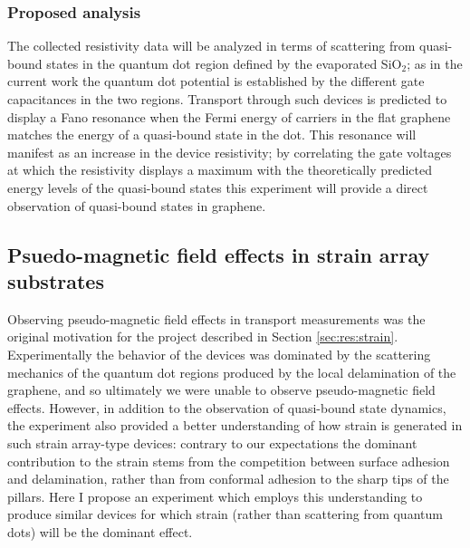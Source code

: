\documentclass[edeposit,fullpage,draftthesis]{uiucthesis2009}
\begin{document}
        \subsubsection*{Proposed analysis}
        
            The collected resistivity data will be analyzed in terms of scattering from quasi-bound
            states in the quantum dot region defined by the evaporated SiO$_2$; as in the current work
            the quantum dot potential is established by the different gate capacitances in the two regions.
            Transport through such devices is predicted to display a Fano
            resonance when the Fermi energy of carriers in the flat graphene matches the energy of a quasi-bound
            state in the dot. This resonance will manifest as an increase in the device resistivity; by
            correlating the gate voltages at which the resistivity displays a maximum with the theoretically
            predicted energy levels of the quasi-bound states this experiment will provide a direct observation
            of quasi-bound states in graphene.
            
        
    \subsection{Psuedo-magnetic field effects in strain array substrates}
        
            Observing pseudo-magnetic field effects in transport measurements was the original motivation
            for the project described in Section \ref{sec:res:strain}. Experimentally the behavior of the
            devices was dominated by the scattering mechanics of the quantum dot regions produced by 
            the local delamination of the graphene, and so ultimately we were unable to observe pseudo-magnetic
            field effects. However, in addition to the observation of quasi-bound state dynamics, the experiment
            also provided a better understanding of how strain is generated in such strain array-type devices: 
            contrary to our expectations the dominant contribution to the strain stems from the 
            competition between surface adhesion and delamination, rather than from conformal adhesion to the sharp
            tips of the pillars.
            Here I propose an experiment which employs this understanding to produce similar devices for which strain
            (rather than scattering from quantum dots) will be the dominant effect.
            
\end{document}
